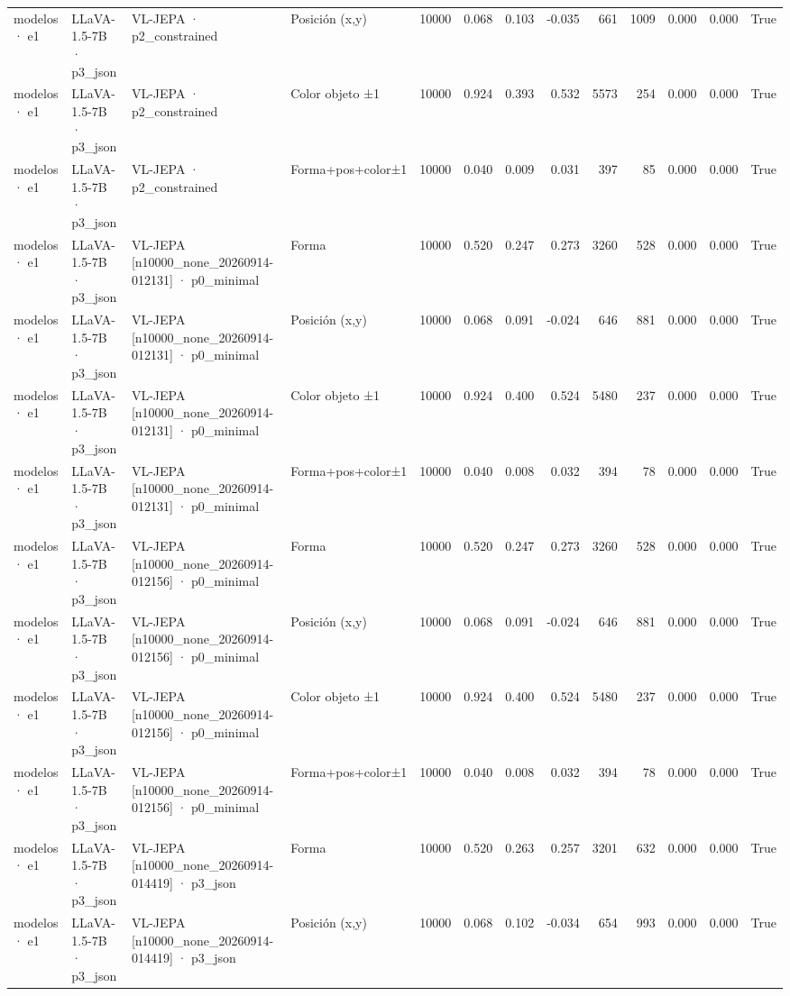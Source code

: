 \begin{tabular}{llllrrrrrrrrr}
modelos · e1 & LLaVA-1.5-7B · p3\_json & VL-JEPA · p2\_constrained & Posición (x,y) & 10000 & 0.068 & 0.103 & -0.035 & 661 & 1009 & 0.000 & 0.000 & True \\
modelos · e1 & LLaVA-1.5-7B · p3\_json & VL-JEPA · p2\_constrained & Color objeto ±1 & 10000 & 0.924 & 0.393 & 0.532 & 5573 & 254 & 0.000 & 0.000 & True \\
modelos · e1 & LLaVA-1.5-7B · p3\_json & VL-JEPA · p2\_constrained & Forma+pos+color±1 & 10000 & 0.040 & 0.009 & 0.031 & 397 & 85 & 0.000 & 0.000 & True \\
modelos · e1 & LLaVA-1.5-7B · p3\_json & VL-JEPA [n10000\_none\_20260914-012131] · p0\_minimal & Forma & 10000 & 0.520 & 0.247 & 0.273 & 3260 & 528 & 0.000 & 0.000 & True \\
modelos · e1 & LLaVA-1.5-7B · p3\_json & VL-JEPA [n10000\_none\_20260914-012131] · p0\_minimal & Posición (x,y) & 10000 & 0.068 & 0.091 & -0.024 & 646 & 881 & 0.000 & 0.000 & True \\
modelos · e1 & LLaVA-1.5-7B · p3\_json & VL-JEPA [n10000\_none\_20260914-012131] · p0\_minimal & Color objeto ±1 & 10000 & 0.924 & 0.400 & 0.524 & 5480 & 237 & 0.000 & 0.000 & True \\
modelos · e1 & LLaVA-1.5-7B · p3\_json & VL-JEPA [n10000\_none\_20260914-012131] · p0\_minimal & Forma+pos+color±1 & 10000 & 0.040 & 0.008 & 0.032 & 394 & 78 & 0.000 & 0.000 & True \\
modelos · e1 & LLaVA-1.5-7B · p3\_json & VL-JEPA [n10000\_none\_20260914-012156] · p0\_minimal & Forma & 10000 & 0.520 & 0.247 & 0.273 & 3260 & 528 & 0.000 & 0.000 & True \\
modelos · e1 & LLaVA-1.5-7B · p3\_json & VL-JEPA [n10000\_none\_20260914-012156] · p0\_minimal & Posición (x,y) & 10000 & 0.068 & 0.091 & -0.024 & 646 & 881 & 0.000 & 0.000 & True \\
modelos · e1 & LLaVA-1.5-7B · p3\_json & VL-JEPA [n10000\_none\_20260914-012156] · p0\_minimal & Color objeto ±1 & 10000 & 0.924 & 0.400 & 0.524 & 5480 & 237 & 0.000 & 0.000 & True \\
modelos · e1 & LLaVA-1.5-7B · p3\_json & VL-JEPA [n10000\_none\_20260914-012156] · p0\_minimal & Forma+pos+color±1 & 10000 & 0.040 & 0.008 & 0.032 & 394 & 78 & 0.000 & 0.000 & True \\
modelos · e1 & LLaVA-1.5-7B · p3\_json & VL-JEPA [n10000\_none\_20260914-014419] · p3\_json & Forma & 10000 & 0.520 & 0.263 & 0.257 & 3201 & 632 & 0.000 & 0.000 & True \\
modelos · e1 & LLaVA-1.5-7B · p3\_json & VL-JEPA [n10000\_none\_20260914-014419] · p3\_json & Posición (x,y) & 10000 & 0.068 & 0.102 & -0.034 & 654 & 993 & 0.000 & 0.000 & True \\

\end{tabular}
